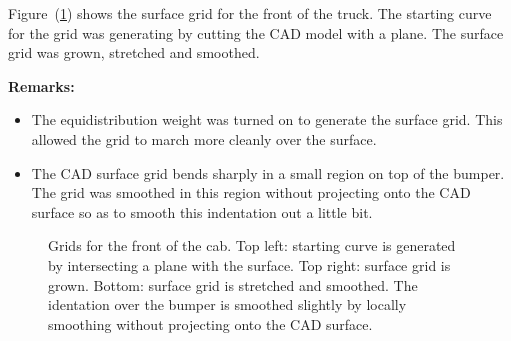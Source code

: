   Figure~(\ref{fig:cabFront}) shows the surface grid for the front of the truck.
The starting curve for the grid was generating by cutting the CAD model
with a plane. The surface grid was grown, stretched and smoothed.

{\bf Remarks:}
\begin{itemize}
  \item The equidistribution weight was turned on to generate the surface grid. This
    allowed the grid to march more cleanly over the surface.
  \item The CAD surface grid bends sharply in a small region on top of the
        bumper. The grid was smoothed in this region without projecting onto the CAD surface
      so as to smooth this indentation out a little bit.
\end{itemize}



{
\newcommand{\figWidthd}{7.5cm}
\newcommand{\trimfig}[2]{\trimPlotb{#1}{#2}{.0}{.0}{.0}{.025}}
\begin{figure}[hbt]
\begin{center}
\end{center}
\caption{Grids for the front of the cab. Top left: starting curve is generated by intersecting a plane with the surface.
    Top right: surface grid is grown. Bottom: surface grid is stretched and smoothed. The
  identation over the bumper is smoothed slightly by locally smoothing without projecting
  onto the CAD surface.}
\label{fig:cabFront}
\end{figure}
}



